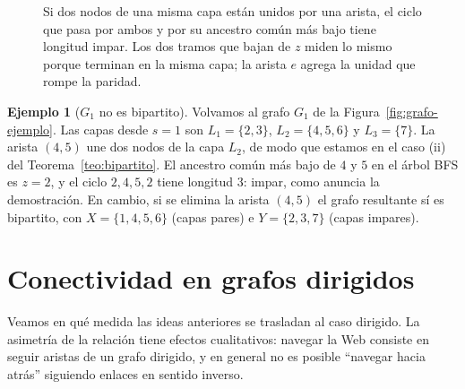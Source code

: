 \documentclass[12pt, spanish, oneside, openany]{book}
\theoremstyle{uprightplain}
\theoremstyle{definition}
\newtheorem{ejemplo}[teorema]{Ejemplo}
\theoremstyle{remark}
\theoremstyle{definition}
\begin{document}
\begin{figure}[H]
\centering
{}
\caption{Si dos nodos de una misma capa están unidos por una arista, el ciclo
que pasa por ambos y por su ancestro común más bajo tiene longitud impar. Los
dos tramos que bajan de $z$ miden lo mismo porque terminan en la misma capa;
la arista $e$ agrega la unidad que rompe la paridad.}
\label{fig:ciclo-impar}
\end{figure}

\begin{ejemplo}[$G_1$ no es bipartito]
\label{ej:g1-no-bipartito}
Volvamos al grafo $G_1$ de la Figura~\ref{fig:grafo-ejemplo}. Las capas desde $s=1$ son $L_1=\{2,3\}$, $L_2=\{4,5,6\}$ y $L_3=\{7\}$. La arista $(4,5)$ une dos nodos de la capa $L_2$, de modo que estamos en el caso (ii) del Teorema~\ref{teo:bipartito}. El ancestro común más bajo de $4$ y $5$ en el árbol BFS es $z=2$, y el ciclo $2,4,5,2$ tiene longitud $3$: impar, como anuncia la demostración. En cambio, si se elimina la arista $(4,5)$ el grafo resultante sí es bipartito, con $X=\{1,4,5,6\}$ (capas pares) e $Y=\{2,3,7\}$ (capas impares).
\end{ejemplo}

\section{Conectividad en grafos dirigidos}
\label{sec:dirigidos}

Veamos en qué medida las ideas anteriores se trasladan al caso dirigido. La asimetría de la relación tiene efectos cualitativos: navegar la Web consiste en seguir aristas de un grafo dirigido, y en general no es posible ``navegar hacia atrás'' siguiendo enlaces en sentido inverso.
\end{document}
